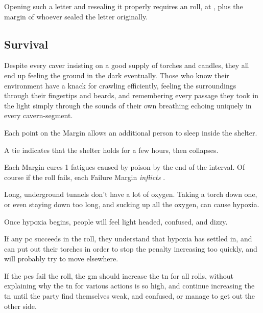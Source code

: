 \begin{multicols}{2}
Opening such a letter and resealing it properly requires an  roll, at \tn[14], plus the margin of whoever sealed the letter originally.

\subsection{Survival}

Despite every caver insisting on a good supply of torches and candles, they all end up feeling the ground in the dark eventually.
Those who know their environment have a knack for crawling efficiently, feeling the surroundings through their fingertips and beards, and remembering every passage they took in the light simply through the sounds of their own breathing echoing uniquely in every cavern-segment.


Each point on the Margin allows an additional person to sleep inside the shelter.

A tie indicates that the shelter holds for a few hours, then collapses.


Each Margin cures 1 \glspl{fatigue} caused by poison by the end of the \gls{interval}.
Of course if the roll fails, each Failure Margin \emph{inflicts} .

Long, underground tunnels don't have a lot of oxygen.
Taking a torch down one, or even staying down too long, and sucking up all the oxygen, can cause hypoxia.

Once hypoxia begins, people will feel light headed, confused, and dizzy.

If any \gls{pc} succeeds in the roll, they understand that hypoxia has settled in, and can put out their torches in order to stop the penalty increasing too quickly, and will probably try to move elsewhere.

If the \glspl{pc} fail the roll, the \gls{gm} should increase the \gls{tn} for all rolls, without explaining why the \gls{tn} for various actions is so high, and continue increasing the \gls{tn} until the party find themselves weak, and confused, or manage to get out the other side.


\end{multicols}
